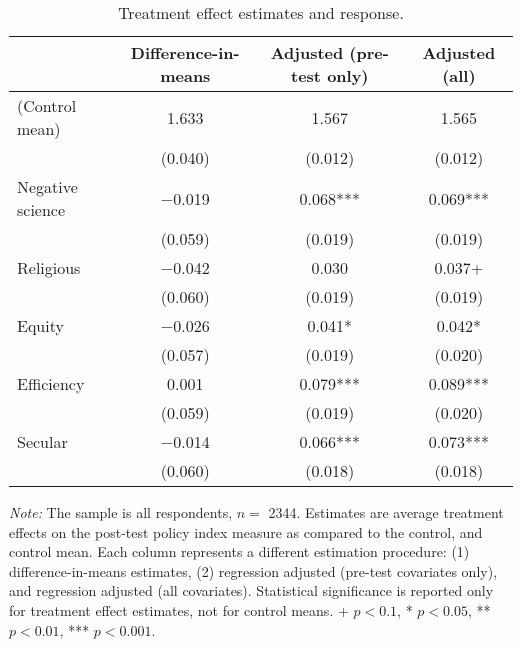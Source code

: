 \begin{table*}

\caption{\label{tab:unnamed-chunk-12}Treatment effect estimates and response.\label{tab:treatment_effects}}
\centering
\begin{threeparttable}
\begin{tabular}[t]{lccc}
\toprule
  & Difference-in-means & Adjusted (pre-test only) & Adjusted (all)\\
\midrule
(Control mean) & \num{1.633} & \num{1.567} & \num{1.565}\\
 & (\num{0.040}) & (\num{0.012}) & (\num{0.012})\\
Negative science & \num{-0.019} & \num{0.068}*** & \num{0.069}***\\
 & (\num{0.059}) & (\num{0.019}) & (\num{0.019})\\
Religious & \num{-0.042} & \num{0.030} & \num{0.037}+\\
 & (\num{0.060}) & (\num{0.019}) & (\num{0.019})\\
Equity & \num{-0.026} & \num{0.041}* & \num{0.042}*\\
 & (\num{0.057}) & (\num{0.019}) & (\num{0.020})\\
Efficiency & \num{0.001} & \num{0.079}*** & \num{0.089}***\\
 & (\num{0.059}) & (\num{0.019}) & (\num{0.020})\\
Secular & \num{-0.014} & \num{0.066}*** & \num{0.073}***\\
 & (\num{0.060}) & (\num{0.018}) & (\num{0.018})\\
\bottomrule
\end{tabular}
\begin{tablenotes}
\item \footnotesize \textit{Note:} The sample is all respondents, $n = $ \num{2344}. Estimates are average treatment effects on the post-test policy index measure as compared to the control, and control mean. Each column represents a different estimation procedure: (1) difference-in-means estimates, (2) regression adjusted (pre-test covariates only), and regression adjusted (all covariates). Statistical significance is reported only for treatment effect estimates, not for control means. + $p < 0.1$, * $p < 0.05$, ** $p < 0.01$, *** $p < 0.001$.
\end{tablenotes}
\end{threeparttable}
\end{table*}
